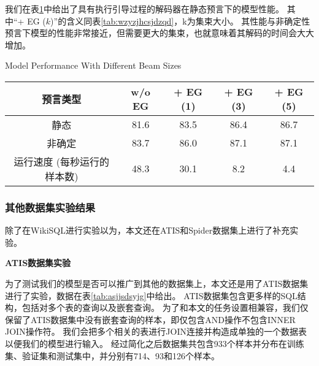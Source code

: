 我们在表\ref{enl2sql:sybtjsdxdmxxn}中给出了具有执行引导过程的解码器在静态预言下的模型性能。
其中“+ EG ($k$)”的含义同表\ref{tab:wzyzjhcsjdzqd}，k为集束大小。
其性能与非确定性预言下模型的性能非常接近，但需要更大的集束，也就意味着其解码的时间会大大增加。

\begin{table}[!hpb]
  \centering
    {Model Performance With Different Beam Sizes}
  \label{enl2sql:sybtjsdxdmxxn}
  \begin{tabular}{ccccc} \toprule
    \textbf{预言类型} & \textbf{w/o EG} & \textbf{+ EG (1)} & \textbf{+ EG (3)} & \textbf{+ EG (5)}\\\midrule
    静态 & 81.6 & 83.5 & 86.4 & 86.7\\
    非确定 & 83.7 & 86.0 & 87.1 & 87.1\\\midrule
    运行速度 (每秒运行的样本数) & 48.3 & 30.1 & 8.2 & 4.4\\
    \bottomrule
  \end{tabular}
\end{table}

\subsubsection{其他数据集实验结果}

除了在WikiSQL进行实验以为，本文还在ATIS\cite{Dahl1994Expanding}和Spider数据集\cite{yu2018spider}上进行了补充实验。

\textbf{ATIS数据集实验}

为了测试我们的模型是否可以推广到其他的数据集上，本文还是用了ATIS数据集进行了实验，数据在表\ref{tab:asjjsdsyjg}中给出。
ATIS数据集包含更多样的SQL结构，包括对多个表的查询以及嵌套查询。
为了和本文的任务设置相兼容，我们仅保留了ATIS数据集中没有嵌套查询的样本，即仅包含AND操作不包含INNER JOIN操作符。
我们会把多个相关的表进行JOIN连接并构造成单独的一个数据表以便我们的模型进行输入。
经过简化之后数据集共包含933个样本并分布在训练集、验证集和测试集中，并分别有714、93和126个样本。

